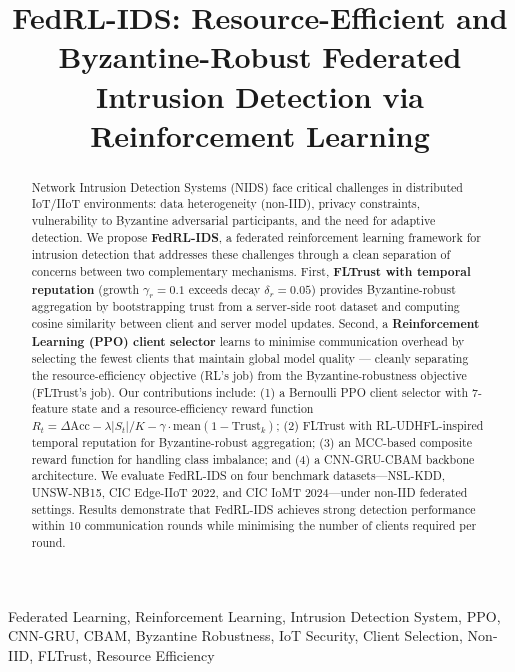 \documentclass[conference]{IEEEtran}
\begin{document}
\title{FedRL-IDS: Resource-Efficient and Byzantine-Robust Federated Intrusion Detection via Reinforcement Learning}

\author{
}

\maketitle

\begin{abstract}
Network Intrusion Detection Systems (NIDS) face critical challenges in distributed IoT/IIoT environments: data heterogeneity (non-IID), privacy constraints, vulnerability to Byzantine adversarial participants, and the need for adaptive detection. We propose \textbf{FedRL-IDS}, a federated reinforcement learning framework for intrusion detection that addresses these challenges through a clean separation of concerns between two complementary mechanisms. First, \textbf{FLTrust with temporal reputation} (growth $\gamma_r=0.1$ exceeds decay $\delta_r=0.05$) provides Byzantine-robust aggregation by bootstrapping trust from a server-side root dataset and computing cosine similarity between client and server model updates. Second, a \textbf{Reinforcement Learning (PPO) client selector} learns to minimise communication overhead by selecting the fewest clients that maintain global model quality — cleanly separating the resource-efficiency objective (RL's job) from the Byzantine-robustness objective (FLTrust's job). Our contributions include: (1) a Bernoulli PPO client selector with 7-feature state and a resource-efficiency reward function $R_t = \Delta\mathrm{Acc} - \lambda|S_t|/K - \gamma \cdot \mathrm{mean}(1 - \mathrm{Trust}_k)$; (2) FLTrust with RL-UDHFL-inspired temporal reputation for Byzantine-robust aggregation; (3) an MCC-based composite reward function for handling class imbalance; and (4) a CNN-GRU-CBAM backbone architecture. We evaluate FedRL-IDS on four benchmark datasets---NSL-KDD, UNSW-NB15, CIC Edge-IIoT 2022, and CIC IoMT 2024---under non-IID federated settings. Results demonstrate that FedRL-IDS achieves strong detection performance within 10 communication rounds while minimising the number of clients required per round.
\end{abstract}

\begin{IEEEkeywords}
Federated Learning, Reinforcement Learning, Intrusion Detection System, PPO, CNN-GRU, CBAM, Byzantine Robustness, IoT Security, Client Selection, Non-IID, FLTrust, Resource Efficiency
\end{IEEEkeywords}
\end{document}
